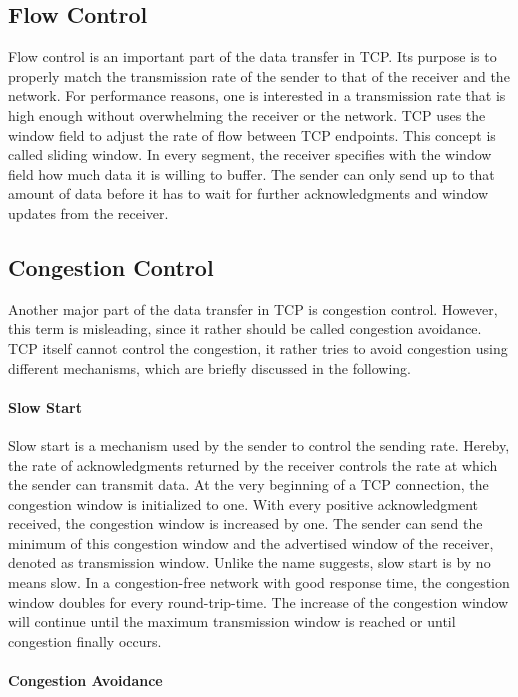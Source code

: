 \subsection*{Flow Control}

Flow control is an important part of the data transfer in TCP. Its purpose is to properly match the transmission rate of the sender to that of the receiver and the network. For performance reasons, one is interested in a transmission rate that is high enough without overwhelming the receiver or the network. TCP uses the window field to adjust the rate of flow between TCP endpoints. This concept is called sliding window. In every segment, the receiver specifies with the window field how much data it is willing to buffer. The sender can only send up to that amount of data before it has to wait for further acknowledgments and window updates from the receiver. 

\subsection*{Congestion Control}

Another major part of the data transfer in TCP is congestion control. However, this term is misleading, since it rather should be called congestion avoidance. TCP itself cannot control the congestion, it rather tries to avoid congestion using different mechanisms, which are briefly discussed in the following. 

\paragraph{Slow Start}

Slow start is a mechanism used by the sender to control the sending rate. Hereby, the rate of acknowledgments returned by the receiver controls the rate at which the sender can transmit data. At the very beginning of a TCP connection, the congestion window is initialized to one. With every positive acknowledgment received, the congestion window is increased by one. The sender can send the minimum of this congestion window and the advertised window of the receiver, denoted as transmission window. Unlike the name suggests, slow start is by no means slow. In a congestion-free network with good response time, the congestion window doubles for every round-trip-time. The increase of the congestion window will continue until the maximum transmission window is reached or until congestion finally occurs.

\paragraph{Congestion Avoidance}

